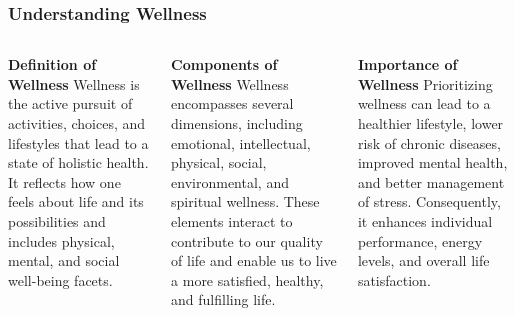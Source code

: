 \documentclass[5pt]{beamer}
\begin{document}
\begin{frame}
\frametitle{Understanding Wellness}
\begin{columns}
\begin{column}{0.3\textwidth}
\begin{block}{\textbf{Definition of Wellness}}
Wellness is the active pursuit of activities, choices, and lifestyles that lead to a state of holistic health. It reflects how one feels about life and its possibilities and includes physical, mental, and social well-being facets.
\end{block}
\end{column}
\begin{column}{0.3\textwidth}
\begin{block}{\textbf{Components of Wellness}}
Wellness encompasses several dimensions, including emotional, intellectual, physical, social, environmental, and spiritual wellness. These elements interact to contribute to our quality of life and enable us to live a more satisfied, healthy, and fulfilling life.
\end{block}
\end{column}
\begin{column}{0.3\textwidth}
\begin{block}{\textbf{Importance of Wellness}}
Prioritizing wellness can lead to a healthier lifestyle, lower risk of chronic diseases, improved mental health, and better management of stress. Consequently, it enhances individual performance, energy levels, and overall life satisfaction.
\end{block}
\end{column}
\end{columns}
\end{frame}
\end{document}

